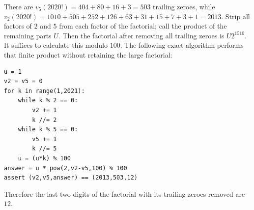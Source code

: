 There are $v_5(2020!)=404+80+16+3=503$ trailing zeroes, while $v_2(2020!)=1010+505+252+126+63+31+15+7+3+1=2013$. Strip all factors of $2$ and $5$ from each factor of the factorial; call the product of the remaining parts $U$. Then the factorial after removing all trailing zeroes is $U2^{1510}$. It suffices to calculate this modulo $100$. The following exact algorithm performs that finite product without retaining the large factorial:
\begin{verbatim}
u = 1
v2 = v5 = 0
for k in range(1,2021):
    while k % 2 == 0:
        v2 += 1
        k //= 2
    while k % 5 == 0:
        v5 += 1
        k //= 5
    u = (u*k) % 100
answer = u * pow(2,v2-v5,100) % 100
assert (v2,v5,answer) == (2013,503,12)
\end{verbatim}
Therefore the last two digits of the factorial with its trailing zeroes removed are $\boxed{12}$.

